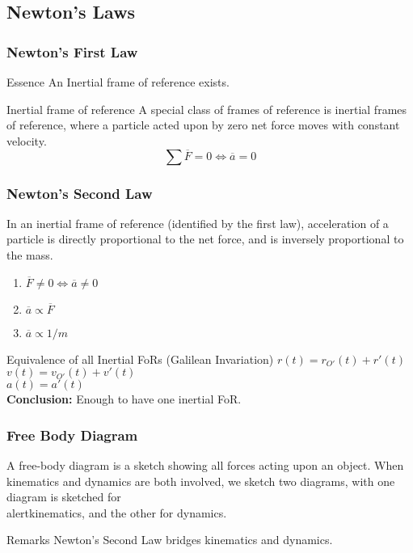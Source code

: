 \subsection{Newton's Laws}
\begin{frame}
\frametitle{Newton's First Law}
\begin{block}{Essence}
An \alert{Inertial} frame of reference exists.
\end{block}
\begin{block}{Inertial frame of reference}
A special class of frames of reference is inertial frames of reference, where a particle acted upon by \alert{zero} net force moves with \alert{constant} velocity.
\[\sum\overline F=0\Leftrightarrow \overline{a}=0\]
\end{block}
\end{frame}
\begin{frame}
\frametitle{Newton's Second Law}
In an \alert{inertial frame of reference} (identified by the \alert{first law}), \alert{acceleration} of a particle is \alert{directly proportional} to the \alert{net force}, and is \alert{inversely proportional} to the mass.
\begin{enumerate}
\item{$\overline{F}\neq 0\Leftrightarrow \overline{a}\neq 0$}
\item{$\overline{a}\propto \overline{F}$}
\item{$\overline{a}\propto 1/m$}
\end{enumerate}
\begin{block}{Equivalence of all Inertial FoRs (Galilean Invariation)}
$r(t)=r_{O'}(t)+r'(t)$\\$v(t)=v_{O'}(t)+v'(t)$\\$a(t)=a'(t)$\\
\textbf{Conclusion:} Enough to have one \alert{inertial} FoR.
\end{block}
\end{frame}
\begin{frame}
\frametitle{Free Body Diagram}
\begin{definition}
A \alert{free-body diagram} is a sketch showing \alert{all} forces acting upon an object. When kinematics and dynamics are both involved, we sketch two diagrams, with one diagram is sketched for \\alert{kinematics}, and the other for \alert{dynamics}.
\end{definition}
\begin{block}{Remarks}
Newton's \alert{Second} Law bridges \alert{kinematics} and \alert{dynamics}.
\end{block}
\end{frame}
